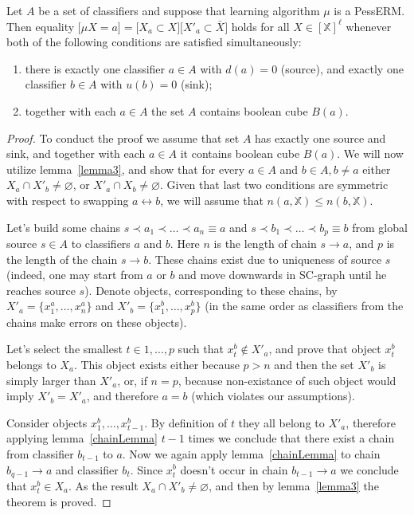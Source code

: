 \documentclass{article}
\def\XX{\mathbb{X}}
\newcommand{\XXell}{[\XX]^\ell}
\newcommand{\X}{\bar X}
\renewcommand{\leq}{\leqslant}
\renewcommand{\emptyset}{\varnothing}\newcommand{\emset}{\varnothing}
\begin{document}
\begin{theorem}
\label{preciseSC_sufficient}
Let $A$ be a set of classifiers and suppose that learning algorithm $\mu$ is a PessERM.
Then equality $\bigl[\mu X = a\bigr] = \bigl[X_{a} \subset X\bigr]\bigl[X'_{a} \subset \X\bigr]$ holds for all $X \in \XXell$
whenever both of the following conditions are satisfied simultaneously:
\begin{enumerate}
\item there is exactly one classifier $a \in A$ with $d(a) = 0$ (source), and exactly one classifier $b \in A$ with $u(b) = 0$ (sink);
\item together with each $a \in A$ the set $A$ contains boolean cube $B(a)$.
\end{enumerate}
\end{theorem}
\begin{proof}
To conduct the proof we assume that set $A$ has exactly one source and sink, and together with each $a \in A$ it contains boolean cube $B(a)$.
We will now utilize lemma~\ref{lemma3}, and show that for every $a \in A$ and $b \in A, b \neq a$ either
$X_{a} \cap X'_{b} \neq \emptyset$, or
$X'_{a} \cap X_{b} \neq \emptyset$.
Given that last two conditions are symmetric with respect to swapping $a \leftrightarrow b$,
we will assume that $n(a, \XX) \leq n(b, \XX)$.

Let's build some chains $s \prec a_1 \prec \dots \prec a_n \equiv a$ and $s \prec b_1 \prec \dots \prec b_p \equiv b$ from global source $s \in A$ to classifiers $a$ and $b$.
Here $n$ is the length of chain $s \rightarrow a$, and $p$ is the length of the chain $s \rightarrow b$.
These chains exist due to uniqueness of source $s$ (indeed, one may start from $a$ or $b$ and move downwards in SC-graph until he reaches source $s$).
Denote objects, corresponding to these chains, by $X'_a = \{x^a_1, \dots, x^a_n\}$ and $X'_b = \{x^b_1, \dots, x^b_p\}$
(in the same order as classifiers from the chains make errors on these objects).

Let's select the smallest $t \in 1, \dots, p$ such that $x^{b}_{t}\not\in X'_a$, and prove that object $x^{b}_{t}$ belongs to $X_{a}$.
This object exists either because $p > n$ and then the set $X'_b$ is simply larger than $X'_a$, or, if $n = p$,
because non-existance of such object would imply $X'_b = X'_a$, and therefore $a = b$ (which violates our assumptions).

Consider objects $x_1^b, \dots, x_{t-1}^b$.
By definition of $t$ they all belong to $X'_a$, therefore
applying lemma~\ref{chainLemma} $t - 1$ times we conclude that there exist a chain from classifier $b_{t - 1}$ to $a$.
Now we again apply lemma~\ref{chainLemma} to chain $b_{q-1} \rightarrow a$ and classifier $b_t$.
Since $x^b_t$ doesn't occur in chain $b_{t-1} \rightarrow a$ we conclude that $x^b_t \in X_a$.
As the result $X_{a} \cap X'_{b} \neq \emptyset$, and then by lemma~\ref{lemma3} the theorem is proved.
\end{proof}
\end{document}
